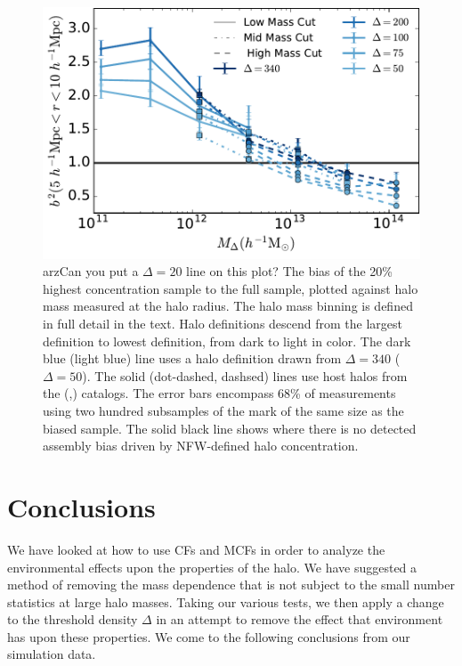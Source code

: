 \documentclass[usenatbib,fleqn]{mnras}
\begin{document}
\begin{figure}
	\centering
	\includegraphics[width=.8\textwidth]{biasplot.pdf}
	\caption{
    arz{Can you put a $\Delta=20$ line on this plot?}
	The bias of the 20\% highest concentration sample to the full sample, plotted against halo mass measured at the halo radius. The halo mass binning is defined in full detail in the text. Halo definitions descend from the largest definition to lowest definition, from dark to light in color. The dark blue (light blue) line uses a halo definition drawn from $\Delta = 340$ ($\Delta = 50$). The solid (dot-dashed, dashsed) lines use host halos from the \simA (\simB,\simC) catalogs. The
	error bars encompass 68\% of measurements using two hundred subsamples
	of the mark of the same size as the biased sample. The solid black line
	shows where there is no detected assembly bias driven by NFW-defined halo concentration.}
	\label{fig:biascompare}
\end{figure}


\section[]{Conclusions}
\label{section:conclusions}

We have looked at how to use CFs and MCFs in order to analyze the environmental effects upon the properties of the halo. We have suggested a method of removing the mass dependence that is not subject to the small number statistics at large halo masses. Taking our various tests, we then apply a change to the threshold density $\Delta$ in an attempt to remove the effect that environment has upon these properties. We come to the following conclusions from our simulation data.
\end{document}
